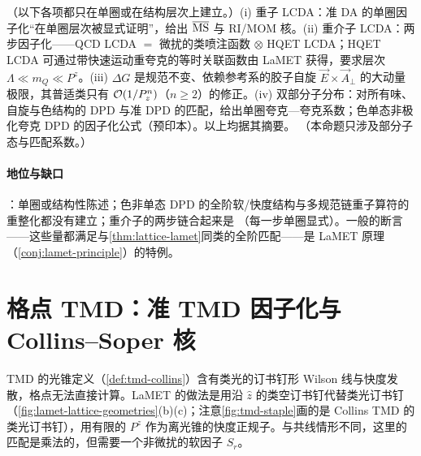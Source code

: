 \begin{proposition}\label{prop:lamet-other-objects}
（以下各项都只在单圈或在结构层次上建立。）(i) 重子 LCDA：准 DA 的单圈因子化“在单圈层次被显式证明”，给出 $\overline{\mathrm{MS}}$ 与 RI/MOM 核\cite{Deng:2023csv}。(ii) 重介子 LCDA：两步因子化——QCD LCDA $=$ 微扰的类喷注函数 $\otimes$ HQET LCDA\cite{Beneke:2023nmj}；HQET LCDA 可通过带快速运动重夸克的等时关联函数由 LaMET 获得\cite{Han:2024fkr}，要求层次 $\Lambda\ll m_Q\ll P^z$。(iii) $\Delta G$ 是规范不变、依赖参考系的胶子自旋 $\vec E\times\vec A_\perp$ 的大动量极限\cite{Ji:2013fga}，其普适类只有 $\mathcal{O}\!\left(1/P_z^n\right)$（$n\ge2$）的修正\cite{Hatta:2013gta}。(iv) 双部分子分布：对所有味、自旋与色结构的 DPD 与准 DPD 的匹配，给出单圈夸克—夸克系数\cite{Jaarsma:2023woo}；色单态非极化夸克 DPD 的因子化公式\cite{Zhang:2023wea}（预印本）。以上均据其摘要。
（本命题只涉及部分子态与匹配系数。）
\end{proposition}

\paragraph{地位与缺口}
\tagP：单圈或结构性陈述；色非单态 DPD 的全阶软/快度结构与多规范链重子算符的重整化都没有建立；重介子的两步链合起来是 \tagP（每一步单圈显式）。一般的断言——这些量都满足与\cref{thm:lattice-lamet}同类的全阶匹配——是 LaMET 原理（\cref{conj:lamet-principle}）的特例。

\section{格点 TMD：准 TMD 因子化与 Collins--Soper 核}\label{sec:lattice-tmd}

TMD 的光锥定义（\cref{def:tmd-collins}）含有类光的订书钉形 Wilson 线与快度发散，格点无法直接计算。LaMET 的做法是用沿 $\hat z$ 的类空订书钉代替类光订书钉（\cref{fig:lamet-lattice-geometries}(b)(c)；注意\cref{fig:tmd-staple}画的是 Collins TMD 的类光订书钉），用有限的 $P^z$ 作为离光锥的快度正规子。与共线情形不同，这里的匹配是乘法的，但需要一个非微扰的软因子 $S_r$。

